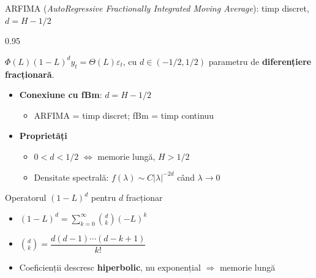 \documentclass[9pt, aspectratio=169, t]{beamer}
\begin{document}
\begin{frame}[shrink=15]{ARFIMA (\textit{AutoRegressive Fractionally Integrated Moving Average}): timp discret, $d=H-1/2$}
\begin{cminipage}{0.95\textwidth}
\begin{defn}[ARFIMA$(p,d,q)$]
$\Phi(L)(1-L)^d y_t=\Theta(L)\varepsilon_t$, cu $d\in(-1/2,1/2)$ parametru de \textbf{diferențiere fracționară}.
\end{defn}
\begin{itemize}\setlength{\itemsep}{0pt}
    \item \textbf{Conexiune cu fBm}: $d=H-1/2$
    \begin{itemize}\setlength{\itemsep}{0pt}
        \item ARFIMA = timp discret; fBm = timp continuu
    \end{itemize}
    \item \textbf{Proprietăți}
    \begin{itemize}\setlength{\itemsep}{0pt}
        \item $0<d<1/2$ $\Leftrightarrow$ memorie lungă, $H>1/2$
        \item Densitate spectrală: $f(\lambda)\sim C|\lambda|^{-2d}$ când $\lambda\to 0$
    \end{itemize}
\end{itemize}
\vspace{0.1cm}
\begin{exampleblock}{Operatorul $(1-L)^d$ pentru $d$ fracționar}
\begin{itemize}\setlength{\itemsep}{0pt}
    \item $(1-L)^d=\sum_{k=0}^\infty \binom{d}{k}(-L)^k$
    \item $\binom{d}{k}=\dfrac{d(d-1)\cdots(d-k+1)}{k!}$
    \item Coeficienții descresc \textbf{hiperbolic}, nu exponențial $\Rightarrow$ memorie lungă
\end{itemize}
\end{exampleblock}
\end{cminipage}
\end{frame}
\end{document}
